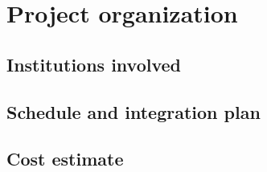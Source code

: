 \section{Project organization}

\subsection{Institutions involved}

\subsection{Schedule and integration plan}

\subsection{Cost estimate}

\clearpage
